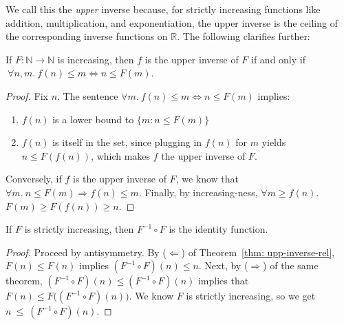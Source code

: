 We call this the \emph{upper} inverse because, for strictly increasing functions like
addition, multiplication, and exponentiation, the upper inverse is the ceiling of the
corresponding inverse functions on $\mathbb{R}$. The following clarifies further:
\begin{thm} \label{thm: upp-inverse-rel}
	\href{https://github.com/inv-ack/inv-ack/blob/7270e64a2600b771f2b1b1b151f7d13fb2ae6c97/inverse.v#L65-L77}{\color{blue}\coq} If $F:\mathbb{N}\to \mathbb{N}$ is increasing, then $f$ is the upper inverse of $F$ if and only if $\ \forall n, m.~ f(n)\le m \iff n \le F(m)$.
\end{thm}
\begin{proof}
Fix $n$. The sentence $\forall m.~ f(n)\le m \iff n\le F(m)$ implies:
\begin{enumerate}
	\item $f(n)$ is a lower bound to $\{m: n \le F(m)\}$ \\ \vspace{-1.2em}
	\item $f(n)$ is itself in the set, since plugging in $f(n)$ for $m$  yields $n\le F(f(n))$, which makes $f$ the upper inverse of $F$. \\ \vspace{-1.2em}
\end{enumerate}	
Conversely, if $f$ is the upper inverse of $F$, we know that \lb $\forall m.~n\le F(m)\Rightarrow f(n)\le m$. Finally, by increasing-ness, $\forall m \ge f(n)$.~$F(m) \ge F(f(n)) \ge n$. 
\end{proof}
\begin{col}\label{col:inv_gives_id}
\href{https://github.com/inv-ack/inv-ack/blob/7270e64a2600b771f2b1b1b151f7d13fb2ae6c97/inverse.v#L79-L90}{\color{blue}\coq}
If $F$ is strictly increasing, then $F^{-1} \circ F$ is
the identity function.
\end{col}
\begin{proof}
Proceed by antisymmetry. By ($\Leftarrow$) of Theorem~\ref{thm: upp-inverse-rel}, \lb $F(n) \le F(n)$ implies
$(F^{-1} \circ F)(n) \le n$.  Next, by ($\Rightarrow$) of the same theorem, $(F^{-1} \circ F)(n) \le (F^{-1} \circ F)(n)$ implies that $F(n) \le F \big((F^{-1} \circ F)(n)\big)$. We know $F$ is strictly increasing, so \lb we get $n~\le~(F^{-1} \circ F)(n)$.
\end{proof}

